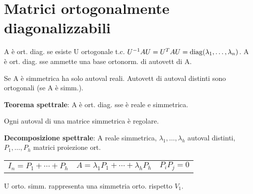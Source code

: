 \section{Matrici ortogonalmente diagonalizzabili}

A è ort. diag. se esiste U ortogonale t.c. $U^{-1}AU = U^TAU = \mathrm{diag}(\lambda_1, \dots, \lambda_n)$.
A è ort. diag. sse ammette una base ortonorm. di autovett di A.

Se A è simmetrica ha solo autoval reali. Autovett di autoval distinti sono ortogonali (se A è simm.).

\textbf{Teorema spettrale}: A è ort. diag. sse è reale e simmetrica.

Ogni autoval di una matrice simmetrica è regolare.

\textbf{Decomposizione spettrale}: A reale simmetrica, $\lambda_1, \dots, \lambda_h$ autoval distinti, $P_1, \dots, P_h$ matrici proiezione ort.
\begin{tabular}{lll}
	$I_n = P_1 + \cdots + P_h$ & $A = \lambda_1P_1 + \cdots + \lambda_hP_h$ & $P_iP_j = 0$
\end{tabular}

U orto. simm. rappresenta una simmetria orto. rispetto $V_1$.
